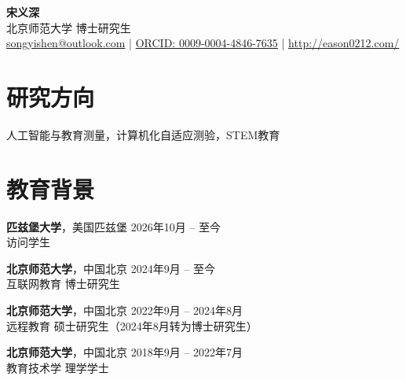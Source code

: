 \documentclass[a4paper,9pt]{extarticle}
\begin{document}
\pagestyle{fancy}
\renewcommand{\headrulewidth}{0pt}
\fancyhead{}
\pagestyle{empty} %

\begin{flushleft}
\textbf{\LARGE 宋义深}\\[2pt] %
北京师范大学 博士研究生
\\ \href{mailto:songyishen@outlook.com}{songyishen@outlook.com} | \href{https://orcid.org/0009-0004-4846-7635}{ORCID: 0009-0004-4846-7635} | \href{http://eason010212.github.io/homepage/}{http://eason0212.com/}
\end{flushleft}

\section*{研究方向}
\noindent
人工智能与教育测量，计算机化自适应测验，STEM教育

\section*{教育背景}
\noindent
\textbf{匹兹堡大学}，美国匹兹堡 \hfill 2026年10月 – 至今 \\ %
访问学生

\noindent
\textbf{北京师范大学}，中国北京 \hfill 2024年9月 – 至今 \\ %
互联网教育 博士研究生

\noindent
\textbf{北京师范大学}，中国北京 \hfill 2022年9月 – 2024年8月  \\ %
远程教育 硕士研究生（2024年8月转为博士研究生）

\noindent
\textbf{北京师范大学}，中国北京 \hfill 2018年9月 – 2022年7月\\ %
教育技术学 理学学士  %
\end{document}
